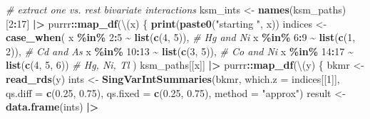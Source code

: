 \documentclass[12pt, twoside]{amherstthesis}
\newenvironment{Shaded}{\begin{snugshade}}{\end{snugshade}}
\newcommand{\AttributeTok}[1]{\textcolor[rgb]{0.13,0.29,0.53}{#1}}
\newcommand{\CommentTok}[1]{\textcolor[rgb]{0.56,0.35,0.01}{\textit{#1}}}
\newcommand{\DecValTok}[1]{\textcolor[rgb]{0.00,0.00,0.81}{#1}}
\newcommand{\FloatTok}[1]{\textcolor[rgb]{0.00,0.00,0.81}{#1}}
\newcommand{\FunctionTok}[1]{\textcolor[rgb]{0.13,0.29,0.53}{\textbf{#1}}}
\newcommand{\NormalTok}[1]{#1}
\newcommand{\OtherTok}[1]{\textcolor[rgb]{0.56,0.35,0.01}{#1}}
\newcommand{\SpecialCharTok}[1]{\textcolor[rgb]{0.81,0.36,0.00}{\textbf{#1}}}
\newcommand{\StringTok}[1]{\textcolor[rgb]{0.31,0.60,0.02}{#1}}
\begin{document}
\begin{Shaded}
\begin{Highlighting}[]
\CommentTok{\# extract one vs. rest bivariate interactions}
\NormalTok{ksm\_ints }\OtherTok{\textless{}{-}} \FunctionTok{names}\NormalTok{(ksm\_paths)[}\DecValTok{2}\SpecialCharTok{:}\DecValTok{17}\NormalTok{] }\SpecialCharTok{|\textgreater{}} 
\NormalTok{  purrr}\SpecialCharTok{::}\FunctionTok{map\_df}\NormalTok{(\textbackslash{}(x) \{}
    \FunctionTok{print}\NormalTok{(}\FunctionTok{paste0}\NormalTok{(}\StringTok{"starting "}\NormalTok{, x))}
\NormalTok{    indices }\OtherTok{\textless{}{-}} \FunctionTok{case\_when}\NormalTok{(}
\NormalTok{      x }\SpecialCharTok{\%in\%} \DecValTok{2}\SpecialCharTok{:}\DecValTok{5} \SpecialCharTok{\textasciitilde{}} \FunctionTok{list}\NormalTok{(}\FunctionTok{c}\NormalTok{(}\DecValTok{4}\NormalTok{, }\DecValTok{5}\NormalTok{)), }\CommentTok{\# Hg and Ni}
\NormalTok{      x }\SpecialCharTok{\%in\%} \DecValTok{6}\SpecialCharTok{:}\DecValTok{9} \SpecialCharTok{\textasciitilde{}} \FunctionTok{list}\NormalTok{(}\FunctionTok{c}\NormalTok{(}\DecValTok{1}\NormalTok{, }\DecValTok{2}\NormalTok{)), }\CommentTok{\# Cd and As}
\NormalTok{      x }\SpecialCharTok{\%in\%} \DecValTok{10}\SpecialCharTok{:}\DecValTok{13} \SpecialCharTok{\textasciitilde{}} \FunctionTok{list}\NormalTok{(}\FunctionTok{c}\NormalTok{(}\DecValTok{3}\NormalTok{, }\DecValTok{5}\NormalTok{)), }\CommentTok{\# Co and Ni}
\NormalTok{      x }\SpecialCharTok{\%in\%} \DecValTok{14}\SpecialCharTok{:}\DecValTok{17} \SpecialCharTok{\textasciitilde{}} \FunctionTok{list}\NormalTok{(}\FunctionTok{c}\NormalTok{(}\DecValTok{4}\NormalTok{, }\DecValTok{5}\NormalTok{, }\DecValTok{6}\NormalTok{)) }\CommentTok{\# Hg, Ni, Tl}
\NormalTok{    )}
\NormalTok{    ksm\_paths[[x]] }\SpecialCharTok{|\textgreater{}} 
\NormalTok{      purrr}\SpecialCharTok{::}\FunctionTok{map\_df}\NormalTok{(\textbackslash{}(y) \{}
\NormalTok{        bkmr }\OtherTok{\textless{}{-}} \FunctionTok{read\_rds}\NormalTok{(y)}
\NormalTok{        ints }\OtherTok{\textless{}{-}} \FunctionTok{SingVarIntSummaries}\NormalTok{(bkmr, }
                                    \AttributeTok{which.z =}\NormalTok{ indices[[}\DecValTok{1}\NormalTok{]], }
                                    \AttributeTok{qs.diff =} \FunctionTok{c}\NormalTok{(}\FloatTok{0.25}\NormalTok{, }\FloatTok{0.75}\NormalTok{), }
                                    \AttributeTok{qs.fixed =} \FunctionTok{c}\NormalTok{(}\FloatTok{0.25}\NormalTok{, }\FloatTok{0.75}\NormalTok{),}
                                    \AttributeTok{method =} \StringTok{"approx"}\NormalTok{)}
\NormalTok{        result }\OtherTok{\textless{}{-}} \FunctionTok{data.frame}\NormalTok{(ints) }\SpecialCharTok{|\textgreater{}} 

\end{Highlighting}
\end{Shaded}
\end{document}
